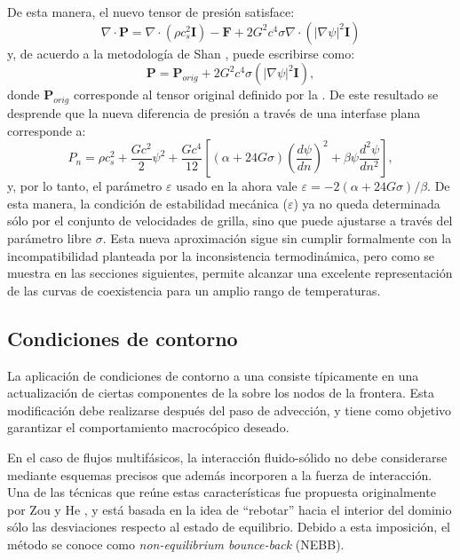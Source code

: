 De esta manera, el nuevo tensor de presi\'on satisface:
\begin{equation}
	\nabla \cdot \bm{P} = \nabla \cdot (\rho c_s^2 \bm{I}) - \bm{F} + 2G^2 c^4 \sigma \nabla \cdot (|\nabla \psi|^2 \bm{I})
\end{equation}
y, de acuerdo a la metodolog\'ia de Shan \cite{shan_pressure_2008}, puede escribirse como:
\begin{equation}
	\bm{P} = \bm{P}_{orig} + 2G^2 c^4 \sigma (|\nabla \psi|^2 \bm{I}),
\end{equation}
donde $\bm{P}_{orig}$ corresponde al tensor original definido por la . De este resultado se desprende que la nueva diferencia de presi\'on a trav\'es de una interfase plana corresponde a:
\begin{equation}
	P_n = \rho c_s^2 + \dfrac{G c^2}{2} \psi^2 + \dfrac{G c^4}{12} \left[ (\alpha+24G\sigma) \left( \dfrac{d\psi}{dn} \right)^2 + \beta \psi \dfrac{d^2 \psi}{dn^2} \right],
\end{equation}
y, por lo tanto, el par\'ametro $\varepsilon$ usado en la  ahora vale $\varepsilon=-2(\alpha + 24 G \sigma)/\beta$. De esta manera, la condici\'on de estabilidad mec\'anica ($\varepsilon$) ya no queda determinada s\'olo por el conjunto de velocidades de grilla, sino que puede ajustarse a trav\'es del par\'ametro libre $\sigma$. Esta nueva aproximaci\'on sigue sin cumplir formalmente con la incompatibilidad planteada por la inconsistencia termodin\'amica, pero como se muestra en las secciones siguientes, permite alcanzar una excelente representaci\'on de las curvas de coexistencia para un amplio rango de temperaturas.




\subsection{Condiciones de contorno}

La aplicaci\'on de condiciones de contorno a una \lbe{} consiste t\'ipicamente en una actualizaci\'on de ciertas componentes de la \fdp{} sobre los nodos de la frontera. Esta modificaci\'on debe realizarse despu\'es del paso de advecci\'on, y tiene como objetivo garantizar el comportamiento macroc\'opico deseado.

En el caso de flujos multif\'asicos, la interacci\'on fluido-s\'olido no debe considerarse mediante esquemas precisos que  adem\'as incorporen a la fuerza de interacci\'on. Una de las t\'ecnicas que re\'une estas caracter\'isticas fue propuesta originalmente por Zou y He \cite{zou_pressure_1997}, y est\'a basada en la idea de ``rebotar'' hacia el interior del dominio s\'olo las desviaciones respecto al estado de equilibrio. Debido a esta imposici\'on, el m\'etodo se conoce como \emph{non-equilibrium bounce-back} (NEBB).

